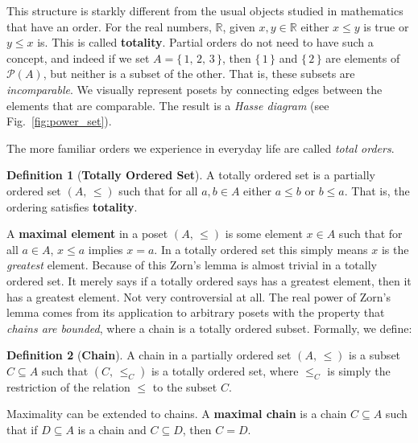 \documentclass{article}
\theoremstyle{definition}
\newtheorem{definition}{Definition}[section]
\begin{document}
            This structure is starkly different from the usual objects studied
            in mathematics that have an order. For the real numbers,
            $\mathbb{R}$, given $x,y\in\mathbb{R}$ either $x\leq{y}$ is true
            or $y\leq{x}$ is. This is called \textbf{totality}. Partial orders
            do not need to have such a concept, and indeed if we set
            $A=\{\,1,\,2,\,3\,\}$, then $\{\,1\,\}$ and $\{\,2\,\}$ are elements
            of $\mathcal{P}(A)$, but neither is a subset of the other. That is,
            these subsets are \textit{incomparable}.
            We visually represent posets by connecting edges between
            the elements that are comparable. The
            result is a \textit{Hasse diagram} (see Fig.~\ref{fig:power_set}).
            \par\hfill\par
            The more familiar orders we experience in everyday life are
            called \textit{total orders}.
            \begin{definition}[\textbf{Totally Ordered Set}]
                A totally ordered set is a partially ordered set
                $(A,\,\leq)$ such that for all $a,b\in{A}$ either
                $a\leq{b}$ or $b\leq{a}$. That is, the ordering satisfies
                \textbf{totality}.
            \end{definition}
            A \textbf{maximal element} in a poset $(A,\,\leq)$ is some element
            $x\in{A}$ such that for all $a\in{A}$, $x\leq{a}$ implies $x=a$.
            In a totally ordered set this simply means $x$ is the
            \textit{greatest} element. Because of this
            Zorn's lemma is almost trivial in a totally ordered set. It merely
            says if a totally ordered says has a greatest element, then it has
            a greatest element. Not very controversial at all. The real power
            of Zorn's lemma comes from its application to arbitrary posets
            with the property that \textit{chains are bounded}, where a chain
            is a totally ordered subset. Formally, we define:
            \begin{definition}[\textbf{Chain}]
                A chain in a partially ordered set $(A,\,\leq)$ is a subset
                $C\subseteq{A}$ such that $(C,\,\leq_{C})$ is a totally ordered
                set, where $\leq_{C}$ is simply the restriction of the relation
                $\leq$ to the subset $C$.
            \end{definition}
            Maximality can be extended to chains. A
            \textbf{maximal chain} is a chain $C\subseteq{A}$ such that if
            $D\subseteq{A}$ is a chain and $C\subseteq{D}$, then $C=D$.
\end{document}
